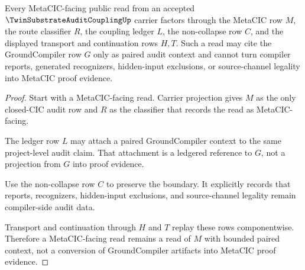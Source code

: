 \begin{theorem}
\label{thm:twin-substrate-audit-coupling-metacic-route}
Every MetaCIC-facing public read from an accepted $\TwinSubstrateAuditCouplingUp$ carrier factors through the MetaCIC row $M$, the route classifier $R$, the coupling ledger $L$, the non-collapse row $C$, and the displayed transport and continuation rows $H,T$. Such a read may cite the GroundCompiler row $G$ only as paired audit context and cannot turn compiler reports, generated recognizers, hidden-input exclusions, or source-channel legality into MetaCIC proof evidence.
\end{theorem}
\begin{proof}
Start with a MetaCIC-facing read. Carrier projection gives $M$ as the only closed-CIC audit row and $R$ as the classifier that records the read as MetaCIC-facing.

The ledger row $L$ may attach a paired GroundCompiler context to the same project-level audit claim. That attachment is a ledgered reference to $G$, not a projection from $G$ into proof evidence.

Use the non-collapse row $C$ to preserve the boundary. It explicitly records that reports, recognizers, hidden-input exclusions, and source-channel legality remain compiler-side audit data.

Transport and continuation through $H$ and $T$ replay these rows componentwise. Therefore a MetaCIC-facing read remains a read of $M$ with bounded paired context, not a conversion of GroundCompiler artifacts into MetaCIC proof evidence.
\end{proof}

